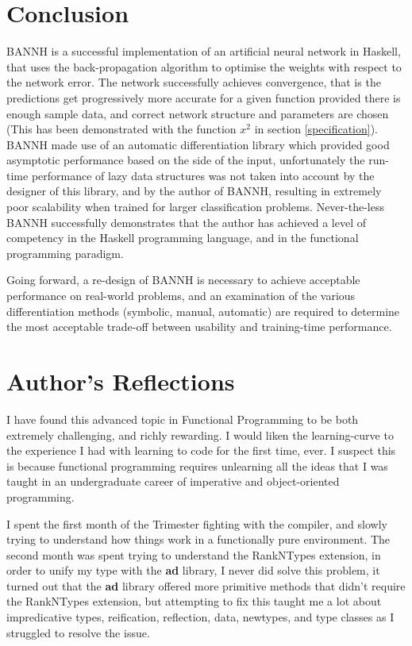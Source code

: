 \documentclass[a4paper]{article}
\begin{document}
\section{Conclusion}
BANNH is a successful implementation of an artificial neural network in
Haskell, that uses the back-propagation algorithm to optimise the weights with
respect to the network error. The network successfully achieves convergence,
that is the predictions get progressively more accurate for a given function
provided there is enough sample data, and correct network structure and
parameters are chosen (This has been demonstrated with the function $x^2$ in
section \ref{specification}). BANNH made use of an automatic differentiation
library which provided good asymptotic performance based on the side of the
input, unfortunately the run-time performance of lazy data structures was not
taken into account by the designer of this library, and by the author of BANNH,
resulting in extremely poor scalability when trained for larger classification
problems. Never-the-less BANNH successfully demonstrates that the author has
achieved a level of competency in the Haskell programming language, and in the
functional programming paradigm. 

Going forward, a re-design of BANNH is necessary to achieve acceptable
performance on real-world problems, and an examination of the various
differentiation methods (symbolic, manual, automatic) are required to determine
the most acceptable trade-off between usability and training-time performance.


\section{Author's Reflections} \label{reflection}
I have found this advanced topic in Functional Programming to be both extremely
challenging, and richly rewarding. I would liken the learning-curve to the
experience I had with learning to code for the first time, ever. I suspect this
is because functional programming requires unlearning all the ideas that I
was taught in an undergraduate career of imperative and object-oriented
programming.

I spent the first month of the Trimester fighting with the compiler, and slowly
trying to understand how things work in a functionally pure environment. The
second month was spent trying to understand the RankNTypes extension, in order
to unify my type with the \textbf{ad} library, I never did solve this 
problem, it
turned out that the \textbf{ad} library offered more primitive methods that 
didn't require the RankNTypes extension, but attempting to fix this taught 
me a lot about impredicative types, reification, reflection, data, newtypes,
and type classes as I struggled to resolve the issue. 
\end{document}
